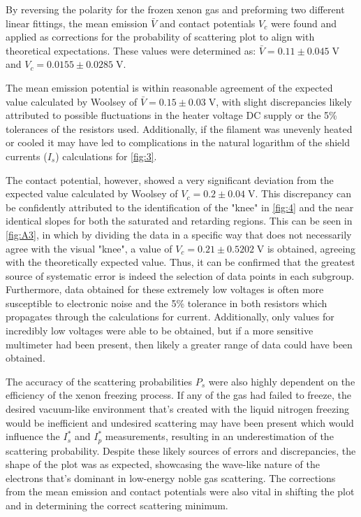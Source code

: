 \documentclass[11pt, a4paper, twocolumn]{article}
\begin{document}
By reversing the polarity for the frozen xenon gas and preforming two different linear fittings, the mean emission $\bar{V}$ and contact potentials $V_c$ were found and applied as corrections for the probability of scattering plot to align with theoretical expectations. These values were determined as: $\bar{V}=0.11\pm 0.045 \; \text{V}$ and $V_c = 0.0155 \pm 0.0285\; \text{V}$. 

The mean emission potential is within reasonable agreement of the expected value calculated by Woolsey \cite{woolsey1971extension} of $\bar{V} = 0.15 \pm 0.03 \;\text{V}$, with slight discrepancies likely attributed to possible fluctuations in the heater voltage DC supply or the 5\% tolerances of the resistors used. Additionally, if the filament was unevenly heated or cooled it may have led to complications in the natural logarithm of the shield currents ($I_s$) calculations for \autoref{fig:3}.

The contact potential, however, showed a very significant deviation from the expected value calculated by Woolsey \cite{woolsey1971extension} of $V_c = 0.2 \pm 0.04 \;\text{V}$. This discrepancy can be confidently attributed to the identification of the "knee" in \autoref{fig:4} and the near identical slopes for both the saturated and retarding regions. This can be seen in \autoref{fig:A3}, in which by dividing the data in a specific way that does not necessarily agree with the visual "knee", a value of $V_c = 0.21 \pm 0.5202 \;\text{V}$ is obtained, agreeing with the theoretically expected value. Thus, it can be confirmed that the greatest source of systematic error is indeed the selection of data points in each subgroup. Furthermore, data obtained for these extremely low voltages is often more susceptible to electronic noise and the 5\% tolerance in both resistors which propagates through the calculations for current. Additionally, only values for incredibly low voltages were able to be obtained, but if a more sensitive multimeter had been present, then likely a greater range of data could have been obtained.

The accuracy of the scattering probabilities $P_s$ were also highly dependent on the efficiency of the xenon freezing process. If any of the gas had failed to freeze, the desired vacuum-like environment that's created with the liquid nitrogen freezing would be inefficient and undesired scattering may have been present which would influence the $I_s^*$ and $I_p^*$ measurements, resulting in an underestimation of the scattering probability. Despite these likely sources of errors and discrepancies, the shape of the plot was as expected, showcasing the wave-like nature of the electrons that's dominant in low-energy noble gas scattering. The corrections from the mean emission and contact potentials were also vital in shifting the plot and in determining the correct scattering minimum.
\end{document}
